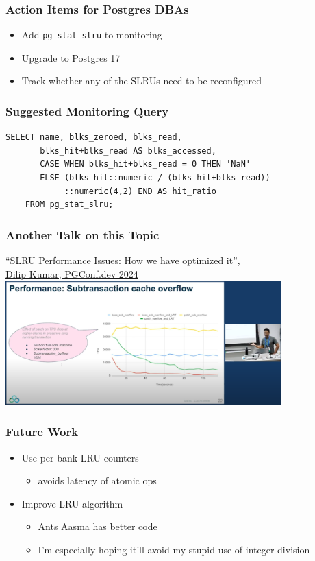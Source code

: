 \begin{frame}
  \frametitle{Action Items for Postgres DBAs}

  \begin{itemize}
    \item Add \texttt{pg\_stat\_slru} to monitoring
    \item Upgrade to Postgres 17
    \item Track whether any of the SLRUs need to be reconfigured
  \end{itemize}
\end{frame}

\begin{frame}[fragile]
  \frametitle{Suggested Monitoring Query}

  \begin{lstlisting}[frame=trBL,frameround=fttt]
  SELECT name, blks_zeroed, blks_read,
       blks_hit+blks_read AS blks_accessed,
       CASE WHEN blks_hit+blks_read = 0 THEN 'NaN'
       ELSE (blks_hit::numeric / (blks_hit+blks_read))
            ::numeric(4,2) END AS hit_ratio
    FROM pg_stat_slru;
  \end{lstlisting}
\end{frame}

\begin{frame}
  \frametitle{Another Talk on this Topic}
\noindent  \href{https://www.pgevents.ca/events/pgconfdev2024/schedule/session/53-problem-in-postgresql-slru-and-how-we-are-optimizing-it/}
  {``SLRU Performance Issues: How we have optimized it'',\\
  Dilip Kumar, PGConf.dev 2024 \faExternalLink}
  \center \includegraphics[width=0.8\textwidth]{dilip.png}
\end{frame}

\begin{frame}
  \frametitle{Future Work}
  \begin{itemize}
    \item Use per-bank LRU counters
      \begin{itemize}
	\item avoids latency of atomic ops
      \end{itemize}
    \item Improve LRU algorithm
      \begin{itemize}
	\item Ants Aasma has better code
	\item I'm especially hoping it'll avoid my stupid use of integer division
      \end{itemize}
  \end{itemize}
\end{frame}
